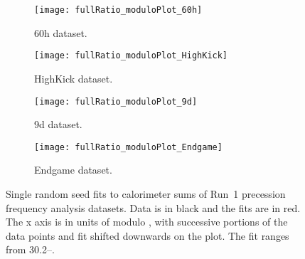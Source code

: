 \begin{figure}[]
\centering
    \begin{subfigure}[]{0.45\textwidth}
        \centering
        \texttt{[image: fullRatio\_moduloPlot\_60h]}
        \caption{60h dataset.}
    \end{subfigure}%
    \begin{subfigure}[]{0.45\textwidth}
        \centering
        \texttt{[image: fullRatio\_moduloPlot\_HighKick]}
        \caption{HighKick dataset.}
    \end{subfigure}

    \begin{subfigure}[]{0.45\textwidth}
        \centering
        \texttt{[image: fullRatio\_moduloPlot\_9d]}
        \caption{9d dataset.}
    \end{subfigure}%
    \begin{subfigure}[]{0.45\textwidth}
        \centering
        \texttt{[image: fullRatio\_moduloPlot\_Endgame]}
        \caption{Endgame dataset.}
    \end{subfigure}
\caption[Single random seed fits to calorimeter sums of Run~1 precession frequency analysis datasets]{Single random seed fits to calorimeter sums of Run~1 precession frequency analysis datasets. Data is in black and the fits are in red. The x axis is in units of \mus{} modulo , with successive portions of the data points and fit shifted downwards on the plot. The fit ranges from 30.2--.}
\label{fig:moduloPlots}
\end{figure}

